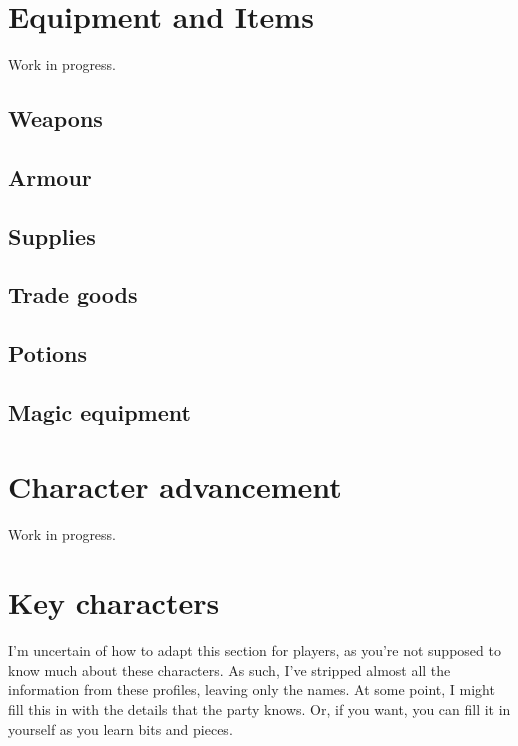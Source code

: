 \documentclass[letterpaper,12pt]{article}
\begin{document}
\section{Equipment and Items}\label{Equipment}

Work in progress.

\subsection{Weapons}

\subsection{Armour}

\subsection{Supplies}

\subsection{Trade goods}

\subsection{Potions}

\subsection{Magic equipment}

\section{Character advancement}\label{LevelingUp}

Work in progress.

\section{Key characters}\label{Characters}

I'm uncertain of how to adapt this section for players, as you're not supposed to know much about these characters. As such, I've stripped almost all the information from these profiles, leaving only the names. At some point, I might fill this in with the details that the party knows. Or, if you want, you can fill it in yourself as you learn bits and pieces.
\end{document}
